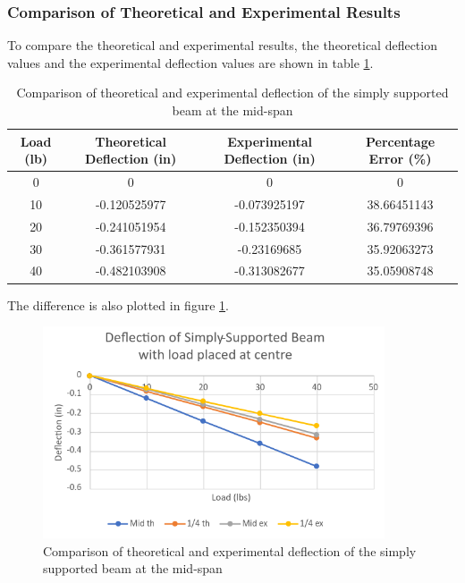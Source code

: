 \documentclass[12pt, titlepage]{article}
\begin{document}
\subsubsection{Comparison of Theoretical and Experimental Results}
To compare the theoretical and experimental results, the theoretical deflection
values and the experimental deflection values are shown in table \ref{tab:ComparisonSimplySupportedBeamMid}.
\begin{table}[H]
  \centering
  \caption{Comparison of theoretical and experimental deflection of the simply supported beam at the mid-span}
  \label{tab:ComparisonSimplySupportedBeamMid}
  \begin{adjustwidth}{-1in}{-1in}
    \begin{tabular}{|c|c|c|c|}
        \hline
        \textbf{Load (lb)} & \textbf{Theoretical Deflection (in)} & \textbf{Experimental Deflection (in)} & \textbf{Percentage Error (\%)} \\
        \hline
        0 & 0 & 0 & 0 \\
        \hline
        10 & -0.120525977 & -0.073925197 & 38.66451143 \\
        \hline
        20 & -0.241051954 & -0.152350394 & 36.79769396 \\
        \hline
        30 & -0.361577931 & -0.23169685 & 35.92063273 \\
        \hline
        40 & -0.482103908 & -0.313082677 & 35.05908748 \\
        \hline
    \end{tabular}
  \end{adjustwidth}
\end{table}
\newpage
The difference is also plotted in figure \ref{fig:ComparisonSimplySupportedBeamMid}.
\begin{figure}[H]
    \centering
    \includegraphics[width=0.9\textwidth]{./Images/S_M_C.png}
    \caption{Comparison of theoretical and experimental deflection of the simply supported beam at the mid-span}
    \label{fig:ComparisonSimplySupportedBeamMid}
\end{figure}
\newpage
\end{document}
